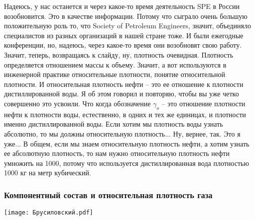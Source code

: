 \documentclass[main.tex]{subfiles}
\begin{document}
Надеюсь, у нас останется и через какое-то время деятельность SPE в России возобновится.
Это в качестве информации.
Потому что сыграло очень большую положительную роль то, что Society of Petroleum Engineers, значит, объединяло специалистов из разных организаций в нашей стране тоже.
И были ежегодные конференции, но, надеюсь, через какое-то время они возобновят свою работу.
Значит, теперь, возвращаясь к слайду, ну, плотность очевидная.
Плотность определяется отношением массы к объему.
Значит, а вот используются в инженерной практике относительные плотности, понятие относительной плотности.
И относительная плотность нефти -- это ее отношение к плотности дистиллированной воды.
Я об этом говорил и повторяю, чтобы вы уже четко совершенно это усвоили.
Что когда обозначение $\gamma_o$ -- это отношение плотности нефти к плотности воды, естественно, в одних и тех же единицах, и плотности именно дистиллированной воды.
Если хотим мы плотность воды узнать абсолютно, то мы должны относительную плотность...
Ну, вернее, так.
Это я уже...
В общем, если мы знаем относительную плотность нефти, а хотим узнать ее абсолютную плотность, то нам нужно относительную плотность нефти умножить на 1000, потому что используется дистиллированная вода плотностью 1000 кг на метр кубический.

\subsubsection{Компонентный состав и относительная плотность газа}

\begin{center}
\texttt{[image: Брусиловский.pdf]}
\end{center}
\end{document}
